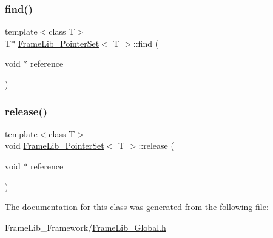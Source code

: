 \mbox{\label{class_frame_lib___pointer_set_ae088998b19a4ad6bc3940c92a1599793}} 
\subsubsection{\texorpdfstring{find()}{find()}}
{\footnotesize\ttfamily template$<$class T$>$ \\
T$\ast$ \hyperlink{class_frame_lib___pointer_set}{Frame\+Lib\+\_\+\+Pointer\+Set}$<$ T $>$\+::find (\begin{DoxyParamCaption}\item[{void $\ast$}]{reference }\end{DoxyParamCaption})\hspace{0.3cm}{\ttfamily [inline]}}

\mbox{\label{class_frame_lib___pointer_set_a0180b8255af17da63729ea4cb904ed33}} 
\subsubsection{\texorpdfstring{release()}{release()}}
{\footnotesize\ttfamily template$<$class T$>$ \\
void \hyperlink{class_frame_lib___pointer_set}{Frame\+Lib\+\_\+\+Pointer\+Set}$<$ T $>$\+::release (\begin{DoxyParamCaption}\item[{void $\ast$}]{reference }\end{DoxyParamCaption})\hspace{0.3cm}{\ttfamily [inline]}}



The documentation for this class was generated from the following file\+:\begin{DoxyCompactItemize}
\item 
Frame\+Lib\+\_\+\+Framework/\hyperlink{_frame_lib___global_8h}{Frame\+Lib\+\_\+\+Global.\+h}\end{DoxyCompactItemize}
